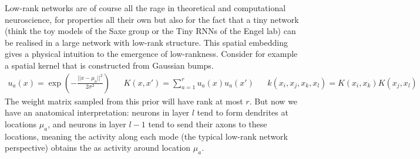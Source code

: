 \documentclass[../main.tex]{subfiles}
\begin{document}
Low-rank networks are of course all the rage in theoretical and computational neuroscience, for properties all their own but also for the fact that a tiny network (think the toy models of the Saxe group or the Tiny RNNs of the Engel lab) can be realised in a large network with low-rank structure. This spatial embedding gives a physical intuition to the emergence of low-rankness. Consider for example a spatial kernel that is constructed from Gaussian bumps.
\begin{align*}
  u_a(x) = \exp \left(-\frac{||x-\mu_a||^2}{2 \sigma^2}\right) 
  &&
  K(x,x') = \sum_{a=1}^r u_a(x) u_a(x')
  &&
  k(x_i, x_j, x_k, x_l) = K(x_i, x_k) K(x_j, x_l) 
\end{align*}
The weight matrix sampled from this prior will have rank at most $r$. But now we have an anatomical interpretation: neurons in layer $l$ tend to form dendrites at locations $\mu_a$, and neurons in layer $l-1$ tend to send their axons to these locations, meaning the activity along each mode (the typical low-rank network perspective) obtains the  as activity around location $\mu_a$. 
\end{document}

